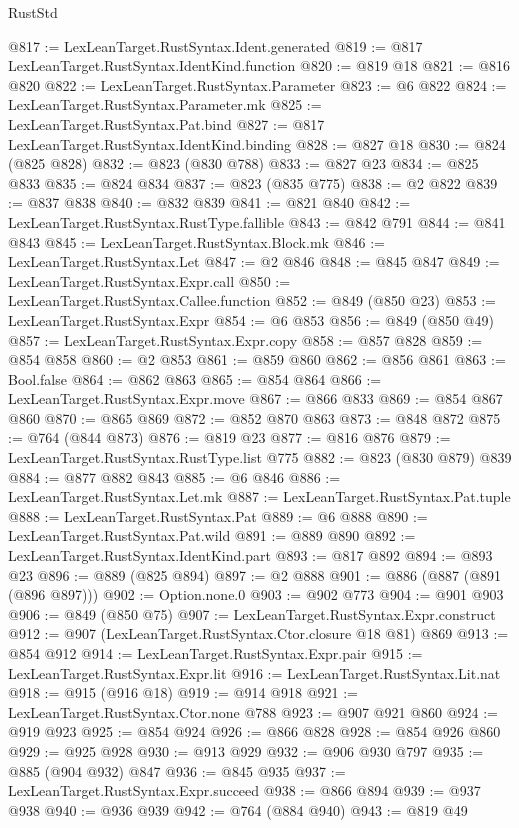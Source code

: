 \begin{lexlean}{RustStd}
\begin{coremodule}
@817 := LexLeanTarget.RustSyntax.Ident.generated
@819 := @817 LexLeanTarget.RustSyntax.IdentKind.function
@820 := @819 @18
@821 := @816 @820
@822 := LexLeanTarget.RustSyntax.Parameter
@823 := @6 @822
@824 := LexLeanTarget.RustSyntax.Parameter.mk
@825 := LexLeanTarget.RustSyntax.Pat.bind
@827 := @817 LexLeanTarget.RustSyntax.IdentKind.binding
@828 := @827 @18
@830 := @824 (@825 @828)
@832 := @823 (@830 @788)
@833 := @827 @23
@834 := @825 @833
@835 := @824 @834
@837 := @823 (@835 @775)
@838 := @2 @822
@839 := @837 @838
@840 := @832 @839
@841 := @821 @840
@842 := LexLeanTarget.RustSyntax.RustType.fallible
@843 := @842 @791
@844 := @841 @843
@845 := LexLeanTarget.RustSyntax.Block.mk
@846 := LexLeanTarget.RustSyntax.Let
@847 := @2 @846
@848 := @845 @847
@849 := LexLeanTarget.RustSyntax.Expr.call
@850 := LexLeanTarget.RustSyntax.Callee.function
@852 := @849 (@850 @23)
@853 := LexLeanTarget.RustSyntax.Expr
@854 := @6 @853
@856 := @849 (@850 @49)
@857 := LexLeanTarget.RustSyntax.Expr.copy
@858 := @857 @828
@859 := @854 @858
@860 := @2 @853
@861 := @859 @860
@862 := @856 @861
@863 := Bool.false
@864 := @862 @863
@865 := @854 @864
@866 := LexLeanTarget.RustSyntax.Expr.move
@867 := @866 @833
@869 := @854 @867 @860
@870 := @865 @869
@872 := @852 @870 @863
@873 := @848 @872
@875 := @764 (@844 @873)
@876 := @819 @23
@877 := @816 @876
@879 := LexLeanTarget.RustSyntax.RustType.list @775
@882 := @823 (@830 @879) @839
@884 := @877 @882 @843
@885 := @6 @846
@886 := LexLeanTarget.RustSyntax.Let.mk
@887 := LexLeanTarget.RustSyntax.Pat.tuple
@888 := LexLeanTarget.RustSyntax.Pat
@889 := @6 @888
@890 := LexLeanTarget.RustSyntax.Pat.wild
@891 := @889 @890
@892 := LexLeanTarget.RustSyntax.IdentKind.part
@893 := @817 @892
@894 := @893 @23
@896 := @889 (@825 @894)
@897 := @2 @888
@901 := @886 (@887 (@891 (@896 @897)))
@902 := Option.none.{0}
@903 := @902 @773
@904 := @901 @903
@906 := @849 (@850 @75)
@907 := LexLeanTarget.RustSyntax.Expr.construct
@912 := @907 (LexLeanTarget.RustSyntax.Ctor.closure @18 @81) @869
@913 := @854 @912
@914 := LexLeanTarget.RustSyntax.Expr.pair
@915 := LexLeanTarget.RustSyntax.Expr.lit
@916 := LexLeanTarget.RustSyntax.Lit.nat
@918 := @915 (@916 @18)
@919 := @914 @918
@921 := LexLeanTarget.RustSyntax.Ctor.none @788
@923 := @907 @921 @860
@924 := @919 @923
@925 := @854 @924
@926 := @866 @828
@928 := @854 @926 @860
@929 := @925 @928
@930 := @913 @929
@932 := @906 @930 @797
@935 := @885 (@904 @932) @847
@936 := @845 @935
@937 := LexLeanTarget.RustSyntax.Expr.succeed
@938 := @866 @894
@939 := @937 @938
@940 := @936 @939
@942 := @764 (@884 @940)
@943 := @819 @49

\end{coremodule}
\end{lexlean}

